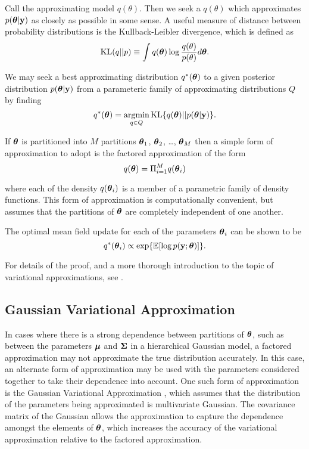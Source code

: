 \documentclass{amsart}[12pt]
\begin{document}
Call the approximating model $q(\theta)$. Then we seek a $q(\theta)$ which approximates $p({\boldsymbol \theta}|{\bf y})$
as closely as possible in some sense. A useful measure of distance between probability distributions is the
Kullback-Leibler divergence, which is defined as
\[
	\text{KL}(q || p) \equiv \int q({\boldsymbol \theta}) \log{\frac{q(\theta)}{p(\theta)}} d {\boldsymbol \theta}.
\]

We may seek a best approximating distribution $q^*({\boldsymbol \theta})$ to a given posterior distribution
$p({\boldsymbol \theta}|{\bf y})$ from a parameteric family of approximating distributions $Q$ by finding
\[
	q^*(\vtheta) = \argmin_{q \in Q} \KL \{ {q(\vtheta) || p(\vtheta|\vy)} \}.
\]

If ${\boldsymbol \theta}$ is partitioned into $M$ partitions ${\boldsymbol \theta}_1$, ${\boldsymbol \theta}_2$, \ldots, ${\boldsymbol \theta}_M$ then a 
simple form of approximation to adopt is the factored approximation of the form
\[
	q({\boldsymbol \theta}) = \Pi_{i=1}^M q({\boldsymbol \theta}_i)
\]

where each of the density $q({\boldsymbol \theta}_i)$ is a member of a parametric family of density functions. This form of
approximation is computationally convenient, but assumes that the partitions of ${\boldsymbol \theta}$ are completely
independent of one another.

The optimal mean field update for each of the parameters ${\boldsymbol \theta}_i$ can be shown to be
\[
	q^*({\boldsymbol \theta}_i) \propto \exp \{ \mathbb{E} [\log p({\bf y}; {\boldsymbol \theta})] \}.
\]

For details of the proof, and a more thorough introduction to the topic of variational approximations, see
\cite{Ormerod2010}.

\subsection{Gaussian Variational Approximation}

In cases where there is a strong dependence between partitions of ${\boldsymbol \theta}$, such as between the parameters
${\boldsymbol \mu}$ and ${\boldsymbol \Sigma}$ in a hierarchical Gaussian model, a factored approximation may not approximate the true
distribution accurately. In this case, an alternate form of approximation may be used with the parameters
considered together to take their dependence into account. One such form of approximation is the Gaussian
Variational Approximation \cite{Ormerod2012}, which assumes that the distribution of the parameters being 
approximated is multivariate Gaussian. The covariance matrix of the Gaussian allows the approximation to
capture the dependence amongst the elements of ${\boldsymbol \theta}$, which increases the accuracy of the variational
approximation relative to the factored approximation.
\end{document}

